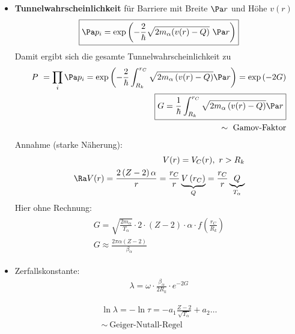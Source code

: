 \begin{itemize}
\item \textbf{Tunnelwahrscheinlichkeit} für Barriere mit Breite $\Pa r$ und Höhe $v(r)$
\begin{align}
\boxed{
\Pa p_i = \exp \left( - \frac{2}{\hbar} \sqrt{2 m_\alpha (v(r) -Q)}\ \Pa r \right)
}
\end{align}
Damit ergibt sich die gesamte Tunnelwahrscheinlichkeit zu 
\begin{align}
P \ = \prod_i \Pa p_i = \exp \left( - \frac{2}{\hbar} \int_{R_k}^{r_C} \sqrt{ 2 m_\alpha \left(v(r) -Q\right)} \Pa r \right) = \exp \left(-2G\right)\\
\boxed{G = \frac{1}{\hbar} \int_{R_k}^{r_C} \sqrt{2 m_\alpha \left(v(r) -Q\right)}\Pa r}\\
\sim \ \text{Gamov-Faktor}\nonumber
\end{align}
Annahme (starke Näherung):
\begin{align}
\begin{split}
V(r) = V_C(r), \ r>R_k\\
\Ra V(r) = \frac{2 \left( Z-2\right)\alpha}{r} = \frac{r_C}{r} \underbrace{V\left(r_C\right)}_Q = \frac{r_C}{r} \underbrace{Q}_{T_\alpha}
\end{split}
\end{align}
Hier ohne Rechnung:
\begin{align}
\begin{split}
G = \sqrt{\frac{2 m_\alpha}{T_\alpha}}\cdot 2 \cdot \left(Z-2\right) \cdot \alpha \cdot f\left(\frac{r_C}{R_k}\right)\\
G \approx \frac{2 \pi \alpha \left(Z-2\right)}{\beta_\alpha}
\end{split}
\end{align}
\item Zerfallskonstante:
\begin{align}
\boxed{ \lambda = \omega \cdot \frac{\beta_\alpha}{2 R_k} \cdot e^{-2G}}
\end{align}
\begin{align}
\ln \lambda = - \ln \tau = - a_1 \frac{Z-2}{\sqrt{T_\alpha}} + a_2 \dots\\
\sim \ \text{Geiger-Nutall-Regel}\nonumber

\end{align}
\end{itemize}
